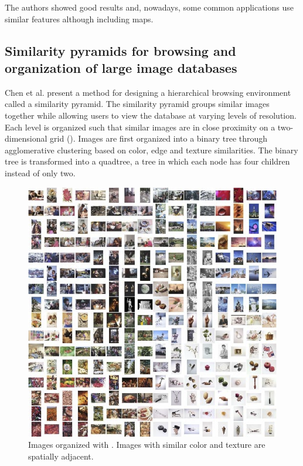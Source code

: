 The authors showed good results and, nowadays, some common applications use similar features although including maps.

\subsection{Similarity pyramids for browsing and organization of large image databases} %
\label{sub:Chen}

Chen et al. \cite{Chen:1998p2344} present a method for designing a hierarchical browsing environment called a similarity pyramid. The similarity pyramid groups similar images together while allowing users to view the database at varying levels of resolution. Each level is organized such that similar images are in close proximity on a two-dimensional grid (). Images are first organized into a binary tree through agglomerative clustering based on color, edge and texture similarities. The binary tree is transformed into a quadtree, a tree in which each node has four children instead of only two.

\begin{figure}[ht]
	\centering
		\includegraphics[scale=0.8]{imgs-RelatedWork/Chen-1998p2344.png}
	\caption{Images organized with \cite{Chen:1998p2344}. Images with similar color and texture are spatially adjacent.}
	\label{fig:Chen1}
\end{figure}

